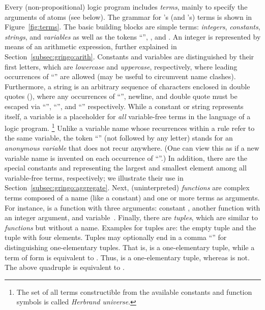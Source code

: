 Every (non-propositional) logic program includes \emph{terms},
mainly to specify the arguments of atoms (see below).
The grammar for \gringo's (and \clingo's) terms is shown in Figure~\ref{fig:terms}.
The basic building blocks are simple terms:
\emph{integers}, \emph{constants}, \emph{strings}, and \emph{variables}
as well as the tokens ``'', , and .
An integer is represented by means of an arithmetic expression,
further explained in Section~\ref{subsec:gringo:arith}.
Constants and variables are distinguished by their first letters,
which are \emph{lowercase} and \emph{uppercase}, respectively,
where leading occurrences of ``'' are allowed
(may be useful to circumvent name clashes).
Furthermore, a string is an arbitrary sequence of characters
enclosed in double quotes (),
where any occurrences of ``\code{\textbackslash}'', newline, and double quote %
must be escaped via ``\code{\textbackslash\textbackslash}'', ``'',
and ``'' respectively.
While a constant or string represents itself,
a variable is a placeholder for \emph{all} variable-free terms
in the language of a logic program.%
\footnote{The set of all terms constructible from the available
          constants and function symbols is called \emph{Herbrand universe}.}
Unlike a variable name whose recurrences within a rule refer to the same variable,
the token ``'' (not followed by any letter)
stands for an \emph{anonymous variable} that does not recur anywhere.
(One can view this as if a new variable name is invented on each
 occurrence of ``''.)
In addition, there are the special constants  and 
representing the largest and smallest element among all variable-free terms, respectively;
we illustrate their use in Section~\ref{subsec:gringo:aggregate}.
Next, (uninterpreted) \emph{functions} are complex terms composed of a name (like a constant)
and one or more terms as arguments. %
For instance,
is a function with three arguments:
constant , another function 
with an integer argument, and variable~.
Finally, there are \emph{tuples}, which are similar to \emph{functions} but without a name.
Examples for tuples are:
the empty tuple \code{()} and
the tuple  with four elements.
Tuples may optionally end in a comma ``\code{,}''
for distinguishing one-elementary tuples.
That is,  is a one-elementary tuple,
while a term of form  is equivalent to .
Thus,  is a one-elementary tuple, whereas  is not.
The above quadruple is equivalent to .

